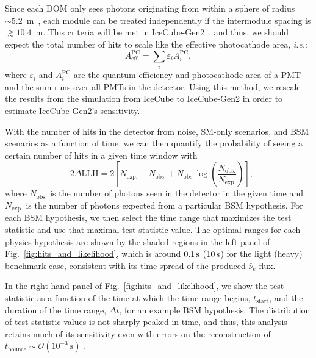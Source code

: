 \documentclass[aps,twocolumn,prl,showpacs,showkeys,preprintnumbers,superscriptaddress,nobibnotes,floatfix,longbibliography,notitlepage,nofootinbib]{revtex4-2}
\begin{document}
Since each DOM only sees photons originating from within a sphere of radius $\sim 5.2$~m~\cite{IceCube:2011cwc}, each module can be treated independently if the intermodule spacing is $\gtrsim10.4$~m.
This criteria will be met in IceCube-Gen2~\cite{IceCube-Gen2:2020qha}, and thus, we should expect the total number of hits to scale like the effective photocathode area, \textit{i.e.}:
$$
A_{\mathrm{eff}}^{\mathrm{PC}} = \sum_{i} \varepsilon_{i} A_{i}^{\mathrm{PC}},
$$
where $\varepsilon_{i}$ and $A_{i}^{\mathrm{PC}}$ are the quantum efficiency and photocathode area of a PMT and the sum runs over all PMTs in the detector.
Using this method, we rescale the results from the simulation from IceCube to IceCube-Gen2 in order to estimate IceCube-Gen2's sensitivity.

With the number of hits in the detector from noise, SM-only scenarios, and BSM scenarios as a function of time, we can then quantify the probability of seeing a certain number of hits in a given time window with
\begin{equation}
    -2\Delta\mathrm{LLH} = 2 \left[N_{\mathrm{exp.}} - N_{\mathrm{obs.}} + N_{\mathrm{obs.}}\log\left(\frac{N_{\mathrm{obs.}}}{N_{\mathrm{exp.}}}\right)\right],
\end{equation}
where $N_{\mathrm{obs.}}$ is the number of photons seen in the detector in the given time and $N_{\mathrm{exp.}}$ is the number of photons expected from a particular BSM hypothesis. For each BSM hypothesis, we then select the time range that maximizes the test statistic and use that maximal test statistic value. The optimal ranges for each physics hypothesis are shown by the shaded regions in the left panel of Fig.~\ref{fig:hits_and_likelihood}, which is around $\unit[0.1]{s}$ ($\unit[10]{s}$) for the light (heavy) benchmark case, consistent with its time spread of the produced $\bar{\nu}_e$ flux.

In the right-hand panel of Fig.~\ref{fig:hits_and_likelihood}, we show the test statistic as a function of the time at which the time range begins, $t_{\mathrm{start}}$, and the duration of the time range, $\Delta t$, for an example BSM hypothesis. The distribution of test-statistic values is not sharply peaked in time, and thus, this analysis retains much of its sensitivity even with errors on the reconstruction of $t_{\mathrm{bounce}}\sim\mathcal{O}\left(10^{-3}~\mathrm{s}\right)$ \cite{Halzen_2009}.
\end{document}

